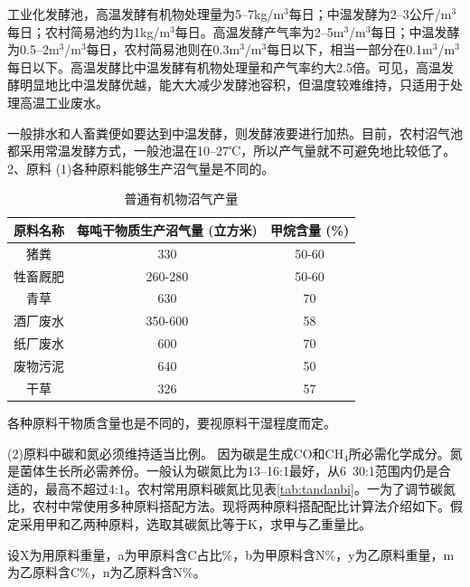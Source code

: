 \documentclass{ctexbook}
\begin{document}
工业化发酵池，高温发酵有机物处理量为5--7kg/m$^3$每日；中温发酵为2--3公斤/m$^3$每日；农村简易池约为1kg/m$^3$每日。高温发酵产气率为2--5m$^3$/m$^3$每日；中温发酵为0.5--2m$^3$/m$^3$每日，农村简易池则在0.3m$^3$/m$^3$每日以下，相当一部分在0.1m$^3$/m$^3$每日以下。高温发酵比中温发酵有机物处理量和产气率约大2.5倍。可见，高温发酵明显地比中温发酵优越，能大大减少发酵池容积，但温度较难维持，只适用于处理高温工业废水。

一般排水和人畜粪便如要达到中温发酵，则发酵液要进行加热。目前，农村沼气池都采用常温发酵方式，一般池温在10--27℃，所以产气量就不可避免地比较低了。
2、原料
(1)各种原料能够生产沼气量是不同的。

\begin{table}[htbp]
	\centering
	\caption{普通有机物沼气产量}
	\begin{tabular}{c|c|c}
				\hline
		原料名称  & 每吨干物质生产沼气量 (立方米) & 甲烷含量 (\%) \\ \hline
		猪粪    & 330   & 50-60 \\ \hline
		牲畜厩肥  & 260-280 & 50-60 \\ \hline
		青草    & 630   & 70 \\ \hline
		酒厂废水  & 350-600 & 58 \\ \hline
		纸厂废水  & 600   & 70 \\ \hline
		废物污泥  & 640   & 50 \\ \hline
		干草    & 326   & 57 \\
				\hline
	\end{tabular}%
	\label{tab:zhaoqichanliang}%
\end{table}%


各种原料干物质含量也是不同的，要视原料干湿程度而定。

(2)原料中碳和氮必须维持适当比例。
因为碳是生成CO和CH$_4$所必需化学成分。氮是菌体生长所必需养份。一般认为碳氮比为13--16:1最好，从6~30:1范围内仍是合适的，最高不超过4:1。农村常用原料碳氮比见表\ref{tab:tandanbi}。一为了调节碳氮比，农村中常使用多种原料搭配方法。现将两种原料搭配配比计算法介绍如下。假定采用甲和乙两种原料，选取其碳氮比等于K，求甲与乙重量比。

设X为用原料重量，a为甲原料含C占比\%，b为甲原料含N\%，y为乙原料重量，m为乙原料含C\%，n为乙原料含N\%。
\end{document}
